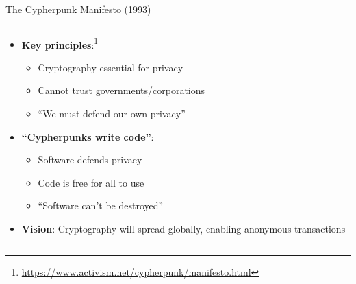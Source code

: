 \documentclass[aspectratio=169, lualatex, handout]{beamer}
\begin{document}
\begin{frame}{The Cypherpunk Manifesto (1993)}
	\begin{columns}[c]
		\begin{column}{1\textwidth}
			\begin{itemize}
				\item \textbf{Key principles}:\footnote{\url{https://www.activism.net/cypherpunk/manifesto.html}}
				      \begin{itemize}
					      \item Cryptography essential for privacy
					      \item Cannot trust governments/corporations
					      \item ``We must defend our own privacy''
				      \end{itemize}
				\item \textbf{``Cypherpunks write code''}:
				      \begin{itemize}
					      \item Software defends privacy
					      \item Code is free for all to use
					      \item ``Software can't be destroyed''
				      \end{itemize}
				\item \textbf{Vision}: Cryptography will spread globally, enabling anonymous transactions
			\end{itemize}
		\end{column}
	\end{columns}
\end{frame}
\end{document}
